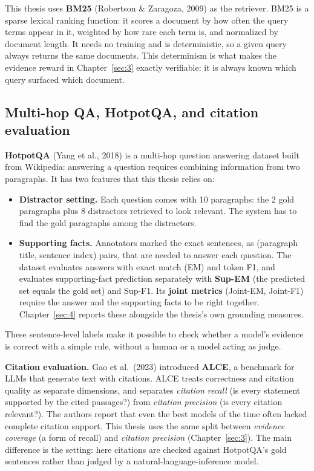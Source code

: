 This thesis uses \textbf{BM25} (Robertson \& Zaragoza, 2009) as the
retriever. BM25 is a sparse lexical ranking function: it scores a
document by how often the query terms appear in it, weighted by how rare
each term is, and normalized by document length. It needs no training
and is deterministic, so a given query always returns the same
documents. This determinism is what makes the evidence reward in
Chapter~\ref{sec:3} exactly verifiable: it is always known which query
surfaced which document.

\subsection{Multi-hop QA, HotpotQA, and citation
evaluation}\label{sec:2.3}

\textbf{HotpotQA} (Yang et al., 2018) is a multi-hop question answering
dataset built from Wikipedia: answering a question requires combining
information from two paragraphs. It has two features that this thesis
relies on:

\begin{itemize}
\tightlist
\item
  \textbf{Distractor setting.} Each question comes with 10 paragraphs:
  the 2 gold paragraphs plus 8 distractors retrieved to look relevant.
  The system has to find the gold paragraphs among the distractors.
\item
  \textbf{Supporting facts.} Annotators marked the exact sentences, as
  (paragraph title, sentence index) pairs, that are needed to answer
  each question. The dataset evaluates answers with exact match (EM) and
  token F1, and evaluates supporting-fact prediction separately with
  \textbf{Sup-EM} (the predicted set equals the gold set) and Sup-F1.
  Its \textbf{joint metrics} (Joint-EM, Joint-F1) require the answer and
  the supporting facts to be right together. Chapter~\ref{sec:4} reports
  these alongside the thesis's own grounding measures.
\end{itemize}

These sentence-level labels make it possible to check whether a model's
evidence is correct with a simple rule, without a human or a model
acting as judge.

\textbf{Citation evaluation.} Gao et al.~(2023) introduced
\textbf{ALCE}, a benchmark for LLMs that generate text with citations.
ALCE treats correctness and citation quality as separate dimensions, and
separates \emph{citation recall} (is every statement supported by the
cited passages?) from \emph{citation precision} (is every citation
relevant?). The authors report that even the best models of the time
often lacked complete citation support. This thesis uses the same split
between \emph{evidence coverage} (a form of recall) and \emph{citation
precision} (Chapter~\ref{sec:3}). The main difference is the setting:
here citations are checked against HotpotQA's gold sentences rather than
judged by a natural-language-inference model.

